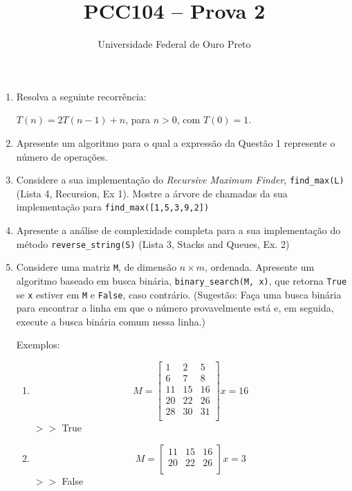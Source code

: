 \documentclass[12pt]{article}
\title{PCC104 – Prova 2}
\author{Universidade Federal de Ouro Preto}
\date{}
\begin{document}
\maketitle


\begin{enumerate}

\item Resolva a seguinte recorrência:

$T(n) = 2T(n-1) + n$, para $n > 0$, com $T(0) = 1$.

\item Apresente um algoritmo para o qual a expressão da Questão 1 represente o número de operações.

\item Considere a sua implementação do \textit{Recursive Maximum Finder}, \texttt{find\_max(L)} (Lista 4, Recursion, Ex 1). Mostre a árvore de chamadas da sua implementação para \texttt{find\_max([1,5,3,9,2])}

\item Apresente a análise de complexidade completa para a sua implementação do método \texttt{reverse\_string(S)} (Lista 3, Stacks and Queues, Ex. 2)

\item Considere uma matriz \texttt{M}, de dimensão $n \times m$, ordenada. Apresente um algoritmo baseado em busca binária, \texttt{binary\_search(M, x)}, que retorna \texttt{True} se \texttt{x} estiver em \texttt{M} e \texttt{False}, caso contrário. (Sugestão: Faça uma busca binária para encontrar a linha em que o número provavelmente está e, em seguida, execute a busca binária comum nessa linha.)

Exemplos: 
\begin{enumerate}
\item 
  \[ M = \begin{bmatrix}
 1&  2&  5  \\
 6&  7&  8  \\
 11& 15 & 16  \\
 20& 22 & 26  \\
 28& 30&  31  \\
\end{bmatrix} x = 16
\]
$>>$ True

\item
\[ M = \begin{bmatrix}
 11& 15 & 16  \\
 20& 22 & 26  \\
\end{bmatrix} x = 3
\]
$>>$ False

\end{enumerate}


\end{enumerate}
\end{document}
